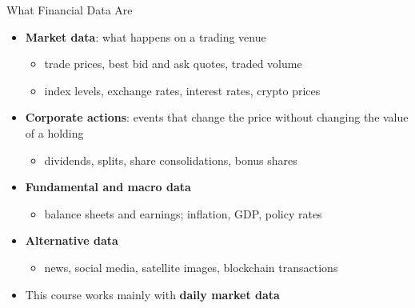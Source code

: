 \begin{frame}{What Financial Data Are}
\itemsize{\small}
\begin{itemize}
    \item \textbf{Market data}: what happens on a trading venue
    \begin{itemize}
        \item trade prices, best bid and ask quotes, traded volume
        \item index levels, exchange rates, interest rates, crypto prices
    \end{itemize}
    \item \textbf{Corporate actions}: events that change the price without changing the value of a holding
    \begin{itemize}
        \item dividends, splits, share consolidations, bonus shares
    \end{itemize}
    \item \textbf{Fundamental and macro data}
    \begin{itemize}
        \item balance sheets and earnings; inflation, GDP, policy rates
    \end{itemize}
    \item \textbf{Alternative data}
    \begin{itemize}
        \item news, social media, satellite images, blockchain transactions
    \end{itemize}
    \item This course works mainly with \textbf{daily market data}
\end{itemize}
\end{frame}

